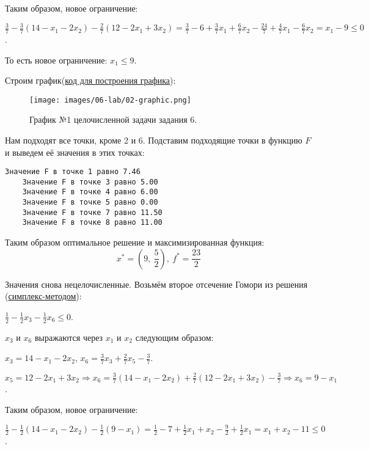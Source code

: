 Таким образом, новое ограничение:

$ \frac{ 3}{ 7} - \frac{ 3}{ 7}(14 - x_1 - 2x_2) - \frac{ 2}{ 7}(12 -2x_1 + 3x_2) = \frac{ 3}{ 7} - 6 + \frac{ 3}{ 7}x_1 + \frac{ 6}{ 7} x_2 - \frac{ 24}{ 7} + \frac{ 4}{ 7}x_1 - \frac{ 6}{ 7}x_2 = x_1 - 9 \leq 0 $.

То есть новое ограничение: $x_1 \leq 9$.

Строим график(\href{https://github.com/retrobannerS/optimization_methods/blob/main/python/06-lab/02-graphic.py}{код для построения графика}):

\begin{figure}[H]
    \leftskip-1.5cm
    \texttt{[image: images/06-lab/02-graphic.png]}
    \caption{График №1 целочисленной задачи задания 6.}
    \label{06-lab-02-graphic}
\end{figure}

Нам подходят все точки, кроме 2 и 6. Подставим подходящие точки в функцию $F$ и выведем её значения в этих точках:

\begin{lstlisting}[language=text]
    Значение F в точке 1 равно 7.46
    Значение F в точке 3 равно 5.00
    Значение F в точке 4 равно 6.00
    Значение F в точке 5 равно 0.00
    Значение F в точке 7 равно 11.50
    Значение F в точке 8 равно 11.00
\end{lstlisting}

Таким образом оптимальное решение и максимизированная функция:
\[x^* = \left(9,\ \dfrac{5}{2}\right),\ f^* = \dfrac{23}{2}\]

Значения снова нецелочисленные. Возьмём второе отсечение Гомори из решения (\hyperref[06-lab-solution-simplex]{симплекс-методом}):

$ \frac{ 1}{ 2} - \frac{ 1}{ 2}x_3 - \frac{ 1}{ 2}x_6 \leq 0 $.

$x_3$ и $x_6$ выражаются через $x_1$ и $x_2$ следующим образом:

$x_3 = 14 - x_1 - 2x_2$, $x_6 = \frac{ 3}{ 7}x_3 + \frac{ 2}{ 7}x_5 - \frac{ 3}{ 7}$.

$x_5 = 12 -2x_1 + 3x_2 \Rightarrow x_6 = \frac{ 3}{ 7}(14 - x_1 - 2x_2) + \frac{ 2}{ 7}(12 -2x_1 + 3x_2) - \frac{ 3}{ 7} \Rightarrow x_6 = 9 - x_1$.

Таким образом, новое ограничение:

$ \frac{ 1}{ 2} - \frac{ 1}{ 2}(14 - x_1 - 2x_2) - \frac{ 1}{ 2}(9 - x_1) = \frac{ 1}{ 2} - 7 + \frac{ 1}{ 2}x_1 + x_2 - \frac{ 9}{ 2} + \frac{ 1}{ 2}x_1 = x_1 + x_2 - 11 \leq 0 $.

